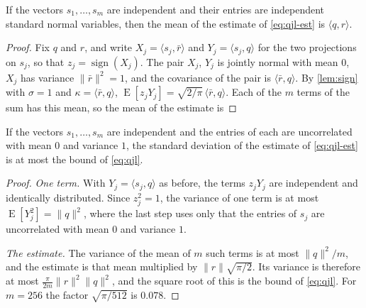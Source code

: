 \begin{proposition}
\label{prop:unbiased}%
If the vectors $s_1, \dots, s_m$ are independent and their entries are
independent standard normal variables, then the mean of the estimate of
\cref{eq:qjl-est} is $\langle q, r \rangle$.
\end{proposition}

\begin{proof}
Fix $q$ and $r$, and write $X_j = \langle s_j, \bar r \rangle$ and
$Y_j = \langle s_j, q \rangle$ for the two projections on $s_j$, so that
$z_j = \operatorname{sign}(X_j)$. The pair $X_j$, $Y_j$ is jointly normal
with mean $0$, $X_j$ has variance $\lVert \bar r \rVert^2 = 1$, and the
covariance of the pair is $\langle \bar r, q \rangle$. By \cref{lem:sign}
with $\sigma = 1$ and $\kappa = \langle \bar r, q \rangle$,
$\operatorname{E}[z_j Y_j] = \sqrt{2/\pi}\, \langle \bar r, q \rangle$. Each
of the $m$ terms of the sum has this mean, so the mean of the estimate is
\end{proof}

\begin{proposition}
\label{prop:qjlvar}%
If the vectors $s_1, \dots, s_m$ are independent and the entries of each are
uncorrelated with mean $0$ and variance $1$, the standard deviation of the
estimate of \cref{eq:qjl-est} is at most the bound of \cref{eq:qjl}.
\end{proposition}

\begin{proof}
\emph{One term.} With $Y_j = \langle s_j, q \rangle$ as before, the terms
$z_j Y_j$ are independent and identically distributed. Since $z_j^2 = 1$,
the variance of one term is at most
$\operatorname{E}[Y_j^2] = \lVert q \rVert^2$, where the last step uses only
that the entries of $s_j$ are uncorrelated with mean $0$ and variance $1$.

\emph{The estimate.} The variance of the mean of $m$ such terms is at most
$\lVert q \rVert^2 / m$, and the estimate is that mean multiplied by
$\lVert r \rVert \sqrt{\pi / 2}$. Its variance is therefore at most
$\tfrac{\pi}{2m} \lVert r \rVert^2 \lVert q \rVert^2$, and the square root of
this is the bound of \cref{eq:qjl}. For $m = 256$ the factor
$\sqrt{\pi / 512}$ is $0.078$.
\end{proof}


